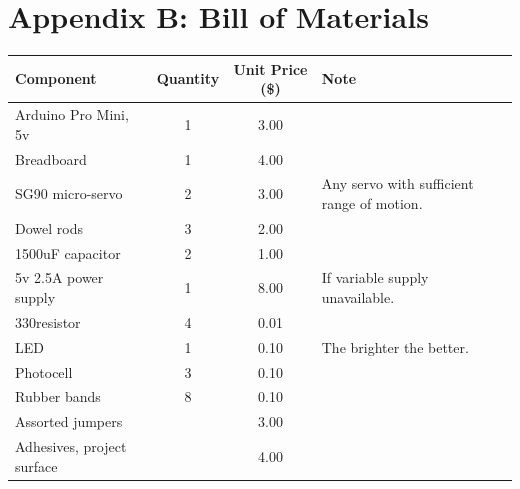 \documentclass{article}
\begin{document}
\section{Appendix B: Bill of Materials}


\begin{center}
	\begin{tabular}{ l c c  p{5cm} }
		\toprule
		Component & Quantity & Unit Price (\$) & Note \\ \midrule
		Arduino Pro Mini, 5v & 1 & 3.00 &  \\ 
		Breadboard & 1 & 4.00 & \\
		SG90 micro-servo & 2 & 3.00 & Any servo with sufficient range of motion.\\ 
		Dowel rods & 3 & 2.00 & \\
		1500uF capacitor & 2 & 1.00 & \\ 
		5v 2.5A power supply & 1 & 8.00 & If variable supply unavailable. \\ 
		330\ohm\space resistor & 4 & 0.01 \\
		LED & 1 & 0.10 & The brighter the better.\\ 
		Photocell & 3 & 0.10 & \\ 
		Rubber bands & 8 & 0.10 & \\
		Assorted jumpers & & 3.00 & \\
		Adhesives, project surface & & 4.00 & \\
		\bottomrule
		
	\end{tabular}
\end{center}
	
	
\end{document}
